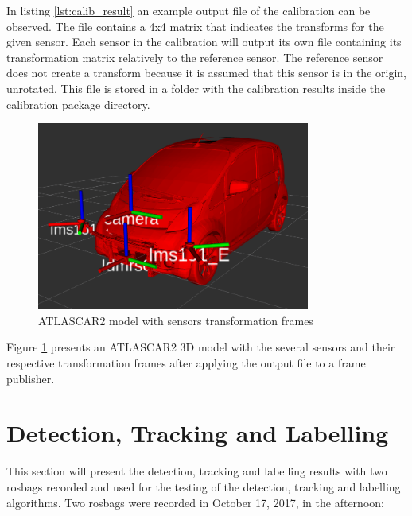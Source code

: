 In listing \ref{lst:calib_result} an example output file of the calibration can be observed. The file contains a 4x4 matrix that indicates the transforms for the given sensor. Each sensor in the calibration will output its own file containing its transformation matrix relatively to the reference sensor. The reference sensor does not create a transform because it is assumed that this sensor is in the origin, unrotated. This file is stored in a folder with the calibration results inside the calibration package directory.

\begin{figure}[htp]
	
	\centering
	\includegraphics[width=0.8\textwidth]{capresults/imgs/modelframes.png}
	
	\caption{ATLASCAR2 model with sensors transformation frames}
	\label{fig:modelframes}
	
\end{figure}

Figure \ref{fig:modelframes} presents an ATLASCAR2 3D model with the several sensors and their respective transformation frames after applying the output file to a frame publisher.

\section{Detection, Tracking and Labelling}

This section will present the detection, tracking and labelling results with two rosbags recorded and used for the testing of the detection, tracking and labelling algorithms. Two rosbags were recorded in October 17, 2017, in the afternoon:

